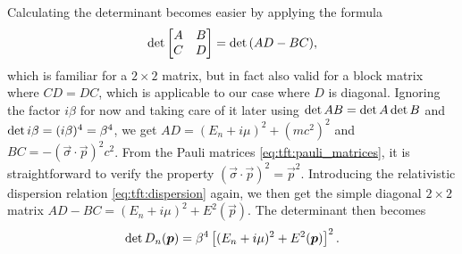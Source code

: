 Calculating the determinant becomes easier by applying the formula
\cite[theorem 3]{ref:determinant_block_matrix}
\begin{equation}
	\operatorname{det} \begin{bmatrix} A & B \\ C & D \\ \end{bmatrix} = \operatorname{det}{(AD - BC)} ,
\end{equation}
which is familiar for a $2 \times 2$ matrix, but in fact also valid for a block matrix where $CD = DC$, which is applicable to our case where $D$ is diagonal.
Ignoring the factor $i \beta$ for now and taking care of it later using $\operatorname{det} AB  = \operatorname{det}{A} \operatorname{det}{B}$ and $\operatorname{det}{i \beta} = (i \beta)^4 = \beta^4$, we get
$AD = (E_n + i \mu)^2 + (mc^2)^2$ and $BC = - (\vec{\sigma} \cdot \vec{p})^2 c^2$.
From the Pauli matrices \eqref{eq:tft:pauli_matrices}, it is straightforward to verify the property $(\vec{\sigma} \cdot \vec{p})^2 = \vec{p}^2$.
Introducing the relativistic dispersion relation \eqref{eq:tft:dispersion} again, we then get the simple diagonal $2 \times 2$ matrix
$AD - BC = (E_n + i \mu)^2 + E^2(\vec{p})$.
The determinant then becomes
\begin{equation}
	\operatorname{det} D_n({\bm{p}}) = \beta^4 \left[ (E_n + i \mu)^2 + E^2({\bm{p}}) \right]^2 .
\end{equation}

\iffalse
\begin{equation}
\begin{split}
	\tdet D  & = \tdet \left\{ -\beta \hbar \omega_n - i \beta \mu + i \beta m c^2 \gamma^0 + i \beta c \gamma^0 \vec{\gamma} \cdot \vec{p} \right\} \\
	         & = \tdet \begin{pmatrix} 
	                 -\beta \hbar \omega_n - i \beta \mu + i \beta m c^2           & i \beta c \vec{\sigma} \cdot \vec{p}                \\ 
	                 i \beta c \vec{\sigma} \cdot \vec{p}                          & -\beta \hbar \omega_n - i \beta \mu - i \beta m c^2 \\ 
	             \end{pmatrix} \\
	         & = \tdet \left\{ (-\beta \hbar \omega_n - i \beta \mu + i \beta mc^2) (-\beta \hbar \omega_n - i \beta \mu - i \beta m c^2) + \beta^2 c^2 (\vec{\sigma} \cdot \vec{p})^2 \right\} \\
	         & = \tdet \left\{ (-\beta \hbar \omega_n - i \beta \mu)^2 + (\beta m c^2)^2 + \beta^2 c^2 \underbrace{(\vec{\sigma} \cdot \vec{p})^2}_{\vec{p}^2} \right\} \\
	         & = \tdet \left\{ \beta^2 \left[ (\hbar \omega_n + i \mu)^2 + \hbar^2 \omega^2 \right] \right\} \\
	         & = \beta^4 \left[ (\hbar \omega_n + i \mu)^2 + \hbar^2 \omega^2 \right]^2
\end{split}
\end{equation}
(TODO: to 4th or 2nd power when taking determinant of diagonal matrix?)
\fi

